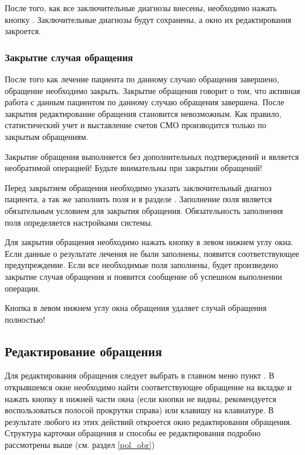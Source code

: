 После того, как все заключительные диагнозы внесены, необходимо нажать кнопку . Заключительные диагнозы будут сохранены, а окно их редактирования закроется.

\subsubsection{Закрытие случая обращения}

После того как лечение пациента по данному случаю обращения завершено, обращение необходимо закрыть. Закрытие обращения говорит о том, что активная работа с данным пациентом по данному случаю обращения завершена. После закрытия редактирование обращения становится невозможным. Как правило, статистический учет и выставление счетов СМО производится только по закрытым обращениям.

\begin{vnim}
 Закрытие обращения выполняется без дополнительных подтверждений и является необратимой операцией! Будьте внимательны при закрытии обращений!
\end{vnim} 
 
Перед закрытием обращения необходимо указать заключительный диагноз пациента, а так же заполнить поля  и  в разделе . Заполнение поля  является обязательным условием для закрытия обращения. Обязательность заполнения поля  определяется настройками системы.

Для закрытия обращения необходимо нажать кнопку  в левом нижнем углу окна. Если данные о результате лечения не были заполнены, появится соответствующее предупреждение. Если все необходимые поля заполнены, будет произведено закрытие случая обращения и появится сообщение об успешном выполнении операции.

\begin{vnim}
 Кнопка  в левом нижнем углу окна обращения удаляет случай обращения полностью!
\end{vnim} 

\subsection{Редактирование обращения}

Для редактирования обращения следует выбрать в главном меню пункт . В открывшемся окне необходимо найти соответствующее обращение на вкладке  и нажать кнопку  в нижней части окна (если кнопки не видны, рекомендуется воспользоваться полосой прокрутки справа) или клавишу  на клавиатуре. В результате любого из этих действий откроется окно редактирования обращения. Структура карточки обращения и способы ее редактирования подробно рассмотрены выше (см. раздел \ref{pol_obr})

